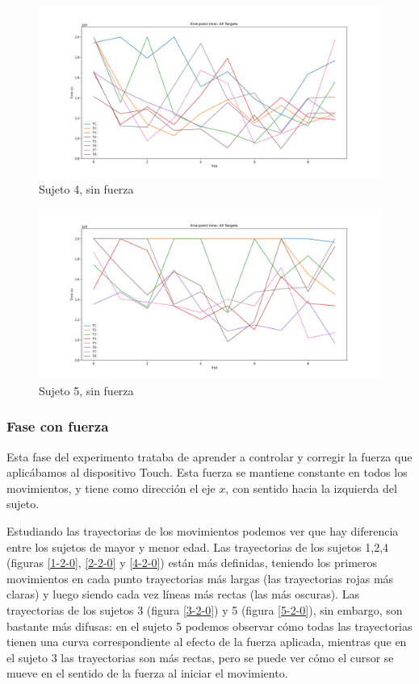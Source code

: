 \documentclass[a4paper,11pt, oneside]{book}
\begin{document}
\begin{figure}[H]
	\includegraphics[width=\linewidth]{sujeto4/no_force/evolution_time}
	\caption{Sujeto 4, sin fuerza}
	\label{4-1-3}
\end{figure}
\begin{figure}[H]
	\includegraphics[width=\linewidth]{sujeto5/no_force/evolution_time}
	\caption{Sujeto 5, sin fuerza}
	\label{5-1-3}
\end{figure}


\subsubsection{Fase con fuerza}

Esta fase del experimento trataba de aprender a controlar y corregir la fuerza que aplicábamos al dispositivo Touch. Esta fuerza se mantiene constante en todos los movimientos, y tiene como dirección el eje $x$, con sentido hacia la izquierda del sujeto.

Estudiando las trayectorias de los movimientos podemos ver que hay diferencia entre los sujetos de mayor y menor edad. Las trayectorias de los sujetos 1,2,4 (figuras \ref{1-2-0}, \ref{2-2-0} y \ref{4-2-0}) están más definidas, teniendo los primeros movimientos en cada punto trayectorias más largas (las trayectorias rojas más claras) y luego siendo cada vez líneas más rectas (las más oscuras). Las trayectorias de los sujetos 3 (figura \ref{3-2-0}) y 5 (figura \ref{5-2-0}), sin embargo, son bastante más difusas: en el sujeto 5 podemos observar cómo todas las trayectorias tienen una curva correspondiente al efecto de la fuerza aplicada, mientras que en el sujeto 3 las trayectorias son más rectas, pero se puede ver cómo el cursor se mueve en el sentido de la fuerza al iniciar el movimiento.
\end{document}
